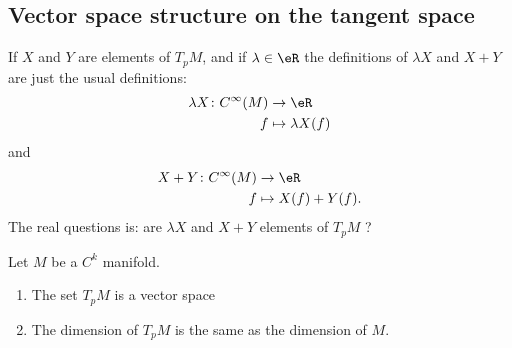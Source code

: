 \subsection{Vector space structure on the tangent space}

If \( X\) and \( Y \) are elements of \( T_pM\), and if \( \lambda\in \eR\) the definitions of \( \lambda X\) and \( X+Y\) are just the usual definitions: 
\begin{equation}
    \begin{aligned}
        \lambda X\colon  C^{\infty}(M)&\to \eR \\
        f&\mapsto \lambda X(f) 
    \end{aligned}
\end{equation}
and
\begin{equation}
    \begin{aligned}
        X+Y\colon  C^{\infty}(M)&\to \eR \\
        f&\mapsto X(f)+Y(f). 
    \end{aligned}
\end{equation}
The real questions is: are \( \lambda X\) and \( X+Y\) elements of \( T_pM\) ?

\begin{proposition}  \label{PROPooEJBWooSbvypo}
    Let \( M\) be a \( C^k\) manifold.
    \begin{enumerate}
        \item
            The set \( T_pM\) is  a vector space
        \item
            The dimension of \( T_pM\) is the same as the dimension of \( M\).
    \end{enumerate}
\end{proposition}

